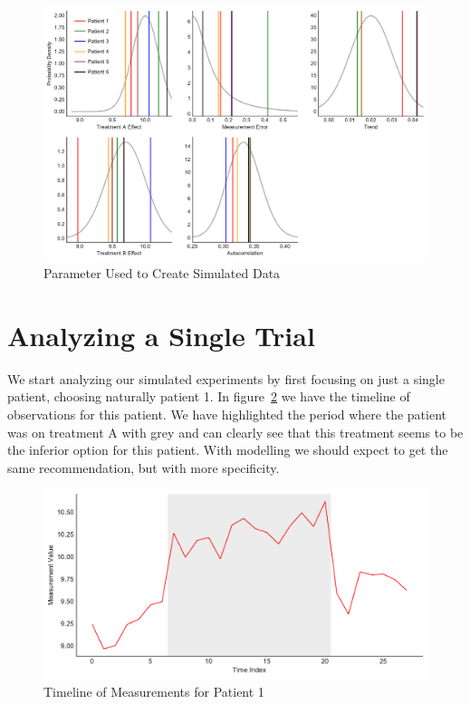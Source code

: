 \documentclass[12pt,a4paper,leqno]{report}
\theoremstyle{plain}
\theoremstyle{definition}
\theoremstyle{remark}
\begin{document}
\begin{figure}[H]
    \caption{Parameter Used to Create Simulated Data}\label{parameterdistribution}
    \bigskip
    \includegraphics[width=\textwidth,height=\textheight,keepaspectratio]{population_parameter_distributions.pdf}
\end{figure}

\section{Analyzing a Single Trial}\label{1trial}

We start analyzing our simulated experiments by first focusing on just a single patient,
choosing naturally patient 1. In figure\ \ref{patient1timeline} we have the timeline of
observations for this patient. We have highlighted the period where the patient was on treatment A with grey and can
clearly see that this treatment seems to be the inferior option for this patient. With modelling
we should expect to get the same recommendation, but with more specificity.

\begin{figure}[H]
    \caption{Timeline of Measurements for Patient 1}\label{patient1timeline}
    \bigskip
    \includegraphics[width=\textwidth,height=\textheight,keepaspectratio]{patient1_timeline.pdf}
\end{figure}
\end{document}
